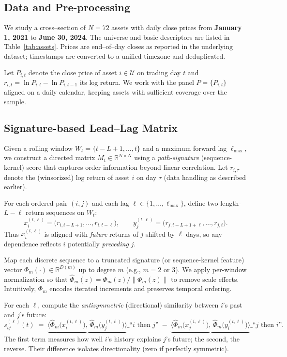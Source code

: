 \subsection{Data and Pre-processing}
We study a cross–section of $N=72$ assets with daily close prices from
\textbf{January 1, 2021} to \textbf{June 30, 2024}.
The universe and basic descriptors are listed in Table~\ref{tab:assets}.
Prices are end–of–day closes as reported in the underlying dataset; timestamps are converted to a unified timezone and deduplicated.

Let $P_{i,t}$ denote the close price of asset $i\in\mathcal{U}$ on trading day $t$ and
$r_{i,t}=\ln P_{i,t}-\ln P_{i,t-1}$ its log return.
We work with the panel $P=\{P_{i,t}\}$ aligned on a daily calendar, keeping assets with sufficient coverage over the sample.%

\subsection{Signature-based Lead--Lag Matrix}\label{sec:signature}

Given a rolling window $W_t=\{t-L+1,\ldots,t\}$ and a maximum forward lag $\ell_{\max}$, we construct a directed matrix $M_t\in\mathbb{R}^{N\times N}$ using a \emph{path-signature} (sequence-kernel) score that captures order information beyond linear correlation. Let $r_{i,\tau}$ denote the (winsorized) log return of asset $i$ on day $\tau$ (data handling as described earlier).

For each ordered pair $(i,j)$ and each lag $\ell\in\{1,\ldots,\ell_{\max}\}$, define two length-$L-\ell$ return sequences on $W_t$:
\[
x^{(t,\ell)}_{i}=\big(r_{i,t-L+1},\ldots,r_{i,t-\ell}\big),\qquad
y^{(t,\ell)}_{j}=\big(r_{j,t-L+1+\ell},\ldots,r_{j,t}\big).
\]
Thus $x^{(t,\ell)}_{i}$ is aligned with \emph{future} returns of $j$ shifted by $\ell$ days, so any dependence reflects $i$ potentially \emph{preceding} $j$.

Map each discrete sequence to a truncated signature (or sequence-kernel feature) vector $\Phi_m(\cdot)\in\mathbb{R}^{D(m)}$ up to degree $m$ (e.g., $m=2$ or $3$). We apply per-window normalization so that
$\widehat\Phi_m(z)=\Phi_m(z)/\|\Phi_m(z)\|$ to remove scale effects. Intuitively, $\Phi_m$ encodes iterated increments and preserves temporal ordering.

For each $\ell$, compute the \emph{antisymmetric} (directional) similarity between $i$’s past and $j$’s future:
\[
s^{(\ell)}_{ij}(t)
\;=\;
\underbrace{\big\langle \widehat\Phi_m\!\big(x^{(t,\ell)}_{i}\big),\,
\widehat\Phi_m\!\big(y^{(t,\ell)}_{j}\big)\big\rangle}\_{\text{``$i$ then $j$''}}
\;-\;
\underbrace{\big\langle \widehat\Phi_m\!\big(x^{(t,\ell)}_{j}\big),\,
\widehat\Phi_m\!\big(y^{(t,\ell)}_{i}\big)\big\rangle}\_{\text{``$j$ then $i$''}}.
\]
The first term measures how well $i$’s history explains $j$’s future; the second, the reverse. Their difference isolates directionality (zero if perfectly symmetric).

